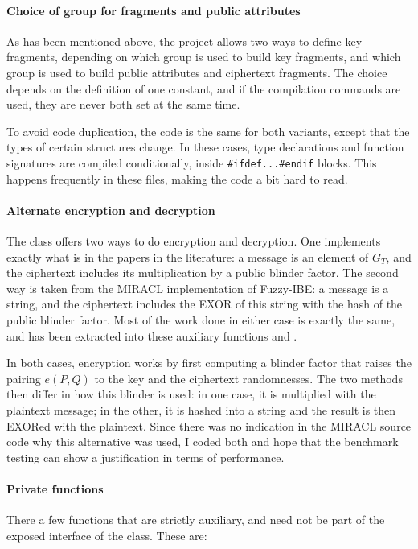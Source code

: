 \documentclass{article}
\begin{document}
\paragraph{Choice of group for fragments and public attributes}

As has been mentioned above, the project allows two ways to define key fragments, depending on which group is used to build key fragments, and which group is used to build public attributes and ciphertext fragments. The choice depends on the definition of one constant, and if the compilation commands are used, they are never both set at the same time.

To avoid code duplication, the code is the same for both variants, except that the types of certain structures change. In these cases, type declarations and function signatures are compiled conditionally, inside \verb|#ifdef...#endif| blocks. This happens frequently in these files, making the code a bit hard to read.

\paragraph{Alternate encryption and decryption}
\label{para:encrypt}
The \cKPABE class offers two ways to do encryption and decryption. One implements exactly what is in the papers in the literature: a message is an element of $G_T$, and the ciphertext includes its multiplication by a public blinder factor. The second way is taken from the MIRACL implementation of Fuzzy-IBE: a message is a string, and the ciphertext includes the EXOR of this string with the hash of the public blinder factor. 
Most of the work done in either case is exactly the same, and has been extracted into these auxiliary functions  and .

In both cases, encryption works by first computing a blinder factor that raises the pairing $e(P,Q)$ to the key and the ciphertext randomnesses. The two methods then differ in how this blinder is used: in one case, it is multiplied with the plaintext message; in the other, it is hashed into a string and the result is then EXORed with the plaintext. Since there was no indication in the MIRACL source code why this alternative was used, I coded both and hope that the benchmark testing can show a justification in terms of performance.

\paragraph{Private functions}
\label{para:private}
There a few functions that are strictly  auxiliary, and need not be part of the exposed interface of the class. These are:
\end{document}
